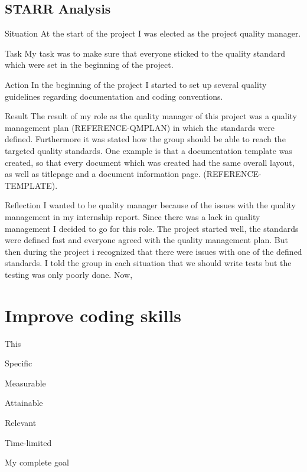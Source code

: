 \documentclass[12pt]{article}
\begin{document}
	\subsection{STARR Analysis}
	\begin{STARR}
	    \item[Situation] At the start of the project I was elected as the project quality manager.
	    \item[Task] My task was to make sure that everyone sticked to the quality standard which were set in the beginning of the project.
	    \item[Action] In the beginning of the project I started to set up several quality guidelines regarding documentation and coding conventions.
	    \item[Result] The result of my role as the quality manager of this project was a quality management plan (REFERENCE-QMPLAN) in which the standards were defined. Furthermore it was stated how the group should be able to reach the targeted quality standards. One example is that a documentation template was created, so that every document which was created had the same overall layout, as well as titlepage and a document information page. (REFERENCE-TEMPLATE).
	    \item[Reflection] I wanted to be quality manager because of the issues with the quality management in my internship report. Since there was a lack in quality management I decided to go for this role. The project started well, the standards were defined fast and everyone agreed with the quality management plan. But then during the project i recognized that there were issues with one of the defined standards. I told the group in each situation that we should write tests but the testing was only poorly done. Now, 
	\end{STARR}
	
	\section{Improve coding skills}
	This
	\begin{SMART}
		\item[Specific]
		\item[Measurable]
		\item[Attainable]
		\item[Relevant]
		\item[Time-limited]
		\item[My complete goal]
	\end{SMART}
	
\end{document}
